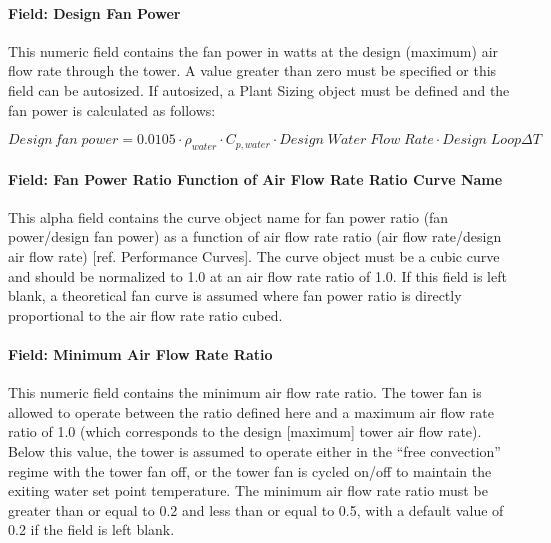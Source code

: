 \paragraph{Field: Design Fan Power}\label{field-design-fan-power-1}

This numeric field contains the fan power in watts at the design (maximum) air flow rate through the tower. A value greater than zero must be specified or this field can be autosized. If autosized, a Plant Sizing object must be defined and the fan power is calculated as follows:

\begin{equation}
Design\,fan\;power = 0.0105\cdot {\rho_{water}}\cdot {C_{p,water}}\cdot Design\;Water\;Flow\;Rate\cdot Design\;Loop\Delta T
\end{equation}

\paragraph{Field: Fan Power Ratio Function of Air Flow Rate Ratio Curve Name}\label{field-fan-power-ratio-function-of-air-flow-rate-ratio-curve-name}

This alpha field contains the curve object name for fan power ratio (fan power/design fan power) as a function of air flow rate ratio (air flow rate/design air flow rate) {[}ref. Performance Curves{]}. The curve object must be a cubic curve and should be normalized to 1.0 at an air flow rate ratio of 1.0. If this field is left blank, a theoretical fan curve is assumed where fan power ratio is directly proportional to the air flow rate ratio cubed.

\paragraph{Field: Minimum Air Flow Rate Ratio}\label{field-minimum-air-flow-rate-ratio-1}

This numeric field contains the minimum air flow rate ratio. The tower fan is allowed to operate between the ratio defined here and a maximum air flow rate ratio of 1.0 (which corresponds to the design {[}maximum{]} tower air flow rate). Below this value, the tower is assumed to operate either in the ``free convection'' regime with the tower fan off, or the tower fan is cycled on/off to maintain the exiting water set point temperature. The minimum air flow rate ratio must be greater than or equal to 0.2 and less than or equal to 0.5, with a default value of 0.2 if the field is left blank.

